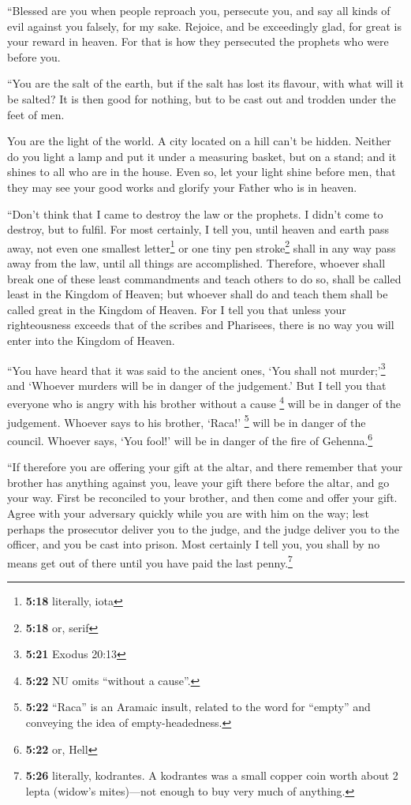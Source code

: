  ``Blessed are you when people reproach you, persecute
you, and say all kinds of evil against you falsely, for my sake.
 Rejoice, and be exceedingly glad, for great is your
reward in heaven. For that is how they persecuted the prophets who were
before you.

 ``You are the salt of the earth, but if the salt has
lost its flavour, with what will it be salted? It is then good for
nothing, but to be cast out and trodden under the feet of men.

 You are the light of the world. A city located on a hill
can't be hidden.  Neither do you light a lamp and put it
under a measuring basket, but on a stand; and it shines to all who are
in the house.  Even so, let your light shine before men,
that they may see your good works and glorify your Father who is in
heaven.

 ``Don't think that I came to destroy the law or the
prophets. I didn't come to destroy, but to fulfil.  For
most certainly, I tell you, until heaven and earth pass away, not even
one smallest letter\footnote{\textbf{5:18} literally, iota} or one tiny
pen stroke\footnote{\textbf{5:18} or, serif} shall in any way pass away
from the law, until all things are accomplished. 
Therefore, whoever shall break one of these least commandments and teach
others to do so, shall be called least in the Kingdom of Heaven; but
whoever shall do and teach them shall be called great in the Kingdom of
Heaven.  For I tell you that unless your righteousness
exceeds that of the scribes and Pharisees, there is no way you will
enter into the Kingdom of Heaven.

 ``You have heard that it was said to the ancient ones,
`You shall not murder;'\footnote{\textbf{5:21} Exodus 20:13} and
`Whoever murders will be in danger of the judgement.' 
But I tell you that everyone who is angry with his brother without a
cause \footnote{\textbf{5:22} NU omits ``without a cause''.} will be in
danger of the judgement. Whoever says to his brother, `Raca!'
\footnote{\textbf{5:22} ``Raca'' is an Aramaic insult, related to the
  word for ``empty'' and conveying the idea of empty-headedness.} will
be in danger of the council. Whoever says, `You fool!' will be in danger
of the fire of Gehenna.\footnote{\textbf{5:22} or, Hell}

 ``If therefore you are offering your gift at the altar,
and there remember that your brother has anything against you,
 leave your gift there before the altar, and go your way.
First be reconciled to your brother, and then come and offer your gift.
 Agree with your adversary quickly while you are with him
on the way; lest perhaps the prosecutor deliver you to the judge, and
the judge deliver you to the officer, and you be cast into prison.
 Most certainly I tell you, you shall by no means get out
of there until you have paid the last penny.\footnote{\textbf{5:26}
  literally, kodrantes. A kodrantes was a small copper coin worth about
  2 lepta (widow's mites)---not enough to buy very much of anything.}


